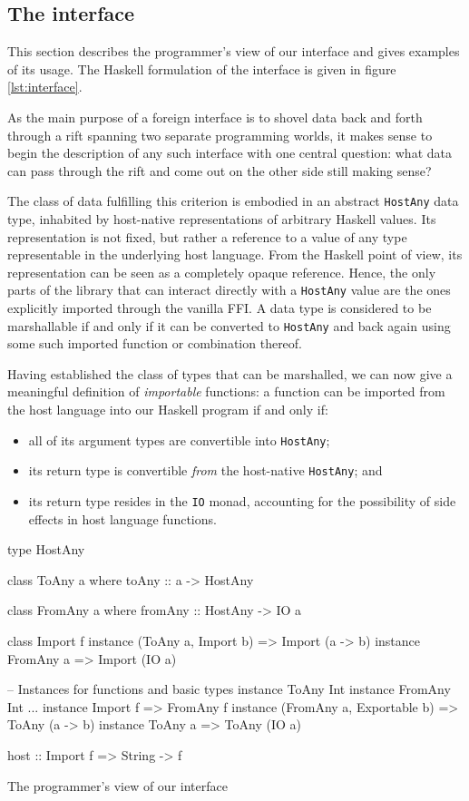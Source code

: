\documentclass[preprint]{sigplanconf}
\begin{document}
\subsection{The interface}
This section describes the programmer's view of our interface and gives
examples of its usage.
The Haskell formulation of the interface is given in figure \ref{lst:interface}.

As the main purpose of a foreign interface is to shovel data back and
forth through a rift spanning two separate programming worlds, it makes sense
to begin the description of any such interface with one central question:
what data can pass through the rift and come out on the other side still making
sense?

The class of data fulfilling this criterion is embodied in an
abstract \lstinline!HostAny! data type, inhabited by host-native
representations of arbitrary Haskell values. Its representation is not fixed,
but rather a reference to a value of any type representable in the underlying
host language. From the Haskell point of view, its representation can be seen
as a completely opaque reference.
Hence, the only parts of the library that can interact directly
with a \lstinline!HostAny! value are the ones explicitly imported through the
vanilla FFI.
A data type is considered to be marshallable if and only if it can be
converted to \lstinline!HostAny! and back again using some such imported
function or combination thereof.

Having established the class of types that can be marshalled, we can now give
a meaningful definition of \emph{importable} functions: a function can be
imported from the host language into our Haskell program if and only if:
\begin{itemize}
\item
  all of its argument types are convertible into \lstinline!HostAny!;
\item
  its return type is convertible \emph{from} the host-native
  \lstinline!HostAny!; and
\item
  its return type resides in the \lstinline!IO! monad, accounting for the
  possibility of side effects in host language functions.
\end{itemize}

\begin{listingfloat}
\begin{code}
type HostAny

class ToAny a where
  toAny :: a -> HostAny

class FromAny a where
  fromAny :: HostAny -> IO a

class Import f
instance (ToAny a, Import b) => Import (a -> b)
instance FromAny a           => Import (IO a)

-- Instances for functions and basic types
instance ToAny Int
instance FromAny Int
...
instance Import f => FromAny f
instance (FromAny a, Exportable b) => ToAny (a -> b)
instance ToAny a => ToAny (IO a)

host :: Import f => String -> f
\end{code}
\caption{The programmer's view of our interface}
\label{lst:interface}
\end{listingfloat}
\end{document}
